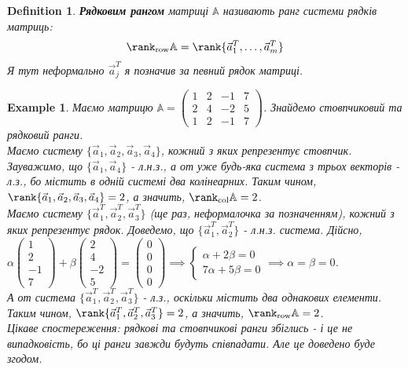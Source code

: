 \documentclass[a4paper, 10pt]{article}
\theoremstyle{theoremdd}
\newtheorem{definition}[theorem]{Definition}
\newtheorem{example}[theorem]{Example}
\begin{document}
\begin{definition}
\textbf{Рядковим рангом} матриці $\mathbb{A}$ називають ранг системи рядків матриць:
\begin{align*}
\rank_{\textrm{row}} \mathbb{A} = \rank \{\vec{a}^T_1,\dots, \vec{a}^T_m \}
\end{align*}
Я тут неформально $\vec{a}^T_j$ я позначив за певний рядок матриці.
\end{definition}

\begin{example}
Маємо матрицю $\mathbb{A} = \begin{pmatrix}
1 & 2 & -1 & 7 \\
2 & 4 & -2 & 5 \\
1 & 2 & -1 & 7
\end{pmatrix}$. Знайдемо стовпчиковий та рядковий ранги.\\
Маємо систему $\{\vec{a}_1,\vec{a}_2,\vec{a}_3,\vec{a}_4 \}$, кожний з яких репрезентує стовпчик. Зауважимо, що $\{\vec{a}_1, \vec{a}_4 \}$ - л.н.з., а от уже будь-яка система з трьох векторів - л.з., бо містить в одній системі два колінеарних. Таким чином, $\rank \{\vec{a}_1,\vec{a}_2,\vec{a}_3,\vec{a}_4\} = 2$, а значить, $\rank_{\text{col}} \mathbb{A} = 2$.\\
Маємо систему $\{\vec{a}_1^T,\vec{a}_2^T,\vec{a}_3^T \}$ (ще раз, неформалочка за позначенням), кожний з яких репрезентує рядок. Доведемо, що $\{\vec{a}_1^T,\vec{a}_2^T \}$ - л.н.з. система. Дійсно,\\
$\alpha\begin{pmatrix}
1 \\ 2 \\ -1 \\ 7
\end{pmatrix} + \beta \begin{pmatrix}
2 \\ 4 \\ -2 \\ 5
\end{pmatrix} = \begin{pmatrix}
0 \\ 0 \\ 0 \\ 0
\end{pmatrix} \implies \begin{cases} \alpha + 2\beta = 0 \\ 7\alpha + 5\beta = 0 \end{cases} \implies \alpha=\beta = 0$.\\
А от система $\{\vec{a}_1^T,\vec{a}_2^T,\vec{a}_3^T \}$ - л.з., оскільки містить два однакових елементи. \\
Таким чином, $\rank\{\vec{a}_1^T,\vec{a}_2^T,\vec{a}_3^T \} = 2$, а значить, $\rank_{\text{row}} \mathbb{A} = 2$.\\
Цікаве спостереження: рядкові та стовпчикові ранги збіглись - і це не випадковість, бо ці ранги завжди будуть співпадати. Але це доведено буде згодом.
\end{example}
\end{document}
